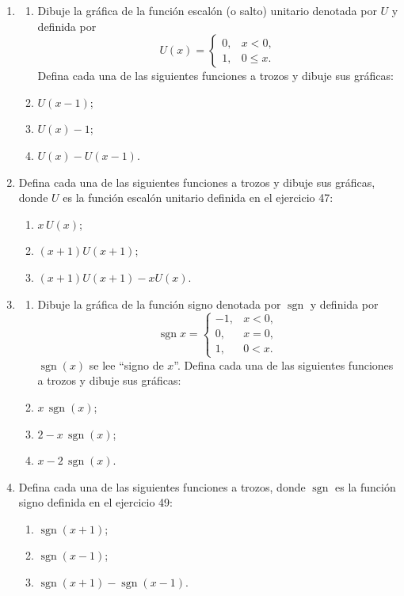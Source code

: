 \documentclass[12pt]{article}
\theoremstyle{remark}
\begin{document}
\begin{enumerate}[start=47]
\item
\begin{enumerate}[label=(\alph*)]
\item Dibuje la gráfica de la función escalón (o salto) unitario denotada por $U$ y definida por
\[
U(x)=\begin{cases}0,&x<0,\\1,&0\le x.\end{cases}
\]
Defina cada una de las siguientes funciones a trozos y dibuje sus gráficas:
\item $U(x-1)$; \item $U(x)-1$; \item $U(x)-U(x-1)$.
\end{enumerate}

\item Defina cada una de las siguientes funciones a trozos y dibuje sus gráficas, donde $U$ es la función escalón unitario definida en el ejercicio 47:
\begin{enumerate}[label=(\alph*)]
\item $x\,U(x)$; \item $(x+1)U(x+1)$; \item $(x+1)U(x+1)-xU(x)$.
\end{enumerate}

\item
\begin{enumerate}[label=(\alph*)]
\item Dibuje la gráfica de la función signo denotada por $\operatorname{sgn}$ y definida por
\[
\operatorname{sgn}x=\begin{cases}-1,&x<0,\\0,&x=0,\\1,&0<x.\end{cases}
\]
$\operatorname{sgn}(x)$ se lee ``signo de $x$''. Defina cada una de las siguientes funciones a trozos y dibuje sus gráficas:
\item $x\,\operatorname{sgn}(x)$; \item $2-x\,\operatorname{sgn}(x)$; \item $x-2\,\operatorname{sgn}(x)$.
\end{enumerate}

\item Defina cada una de las siguientes funciones a trozos, donde $\operatorname{sgn}$ es la función signo definida en el ejercicio 49:
\begin{enumerate}[label=(\alph*)]
\item $\operatorname{sgn}(x+1)$; \item $\operatorname{sgn}(x-1)$; \item $\operatorname{sgn}(x+1)-\operatorname{sgn}(x-1)$.
\end{enumerate}


\end{enumerate}
\end{document}
